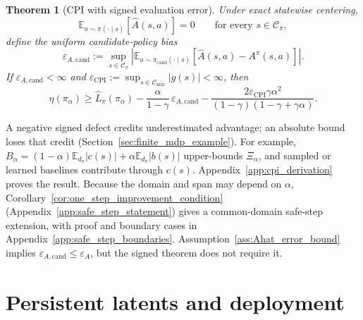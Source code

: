 \documentclass{article}
\theoremstyle{plain}
\newtheorem{theorem}{Theorem}[section]
\theoremstyle{definition}
\theoremstyle{remark}
\newcommand{\E}{\mathbb{E}}
\begin{document}
\begin{theorem}[CPI with signed evaluation error]
Under exact statewise centering,
\begin{equation}
\E_{a\sim\pi(\cdot\mid s)}[\widehat A(s,a)] = 0
\qquad\text{for every }s\in\mathcal C_\pi,
\label{eq:centering_condition}
\end{equation}
define the uniform candidate-policy bias
\begin{equation}
\varepsilon_{A,\mathrm{cand}}
:=
\sup_{s\in\mathcal C_\pi}
\left|
\E_{a\sim\pi_{\mathrm{cand}}(\cdot\mid s)}\!\left[\widehat{A}(s,a)-A^\pi(s,a)\right]
\right|.
\label{eq:epsA0_def}
\end{equation}
If $\varepsilon_{A,\mathrm{cand}}<\infty$ and
$\varepsilon_{\mathrm{CPI}}:=
\sup_{s\in\mathcal C_{\mathrm{mix}}}|g(s)|<\infty$, then
\begin{equation}
\eta(\pi_\alpha)
\ge
\widehat{L}_\pi(\pi_\alpha)
-
\frac{\alpha}{1-\gamma}\,\varepsilon_{A,\mathrm{cand}}
-
\frac{2\varepsilon_{\mathrm{CPI}}\gamma\alpha^2}
{(1-\gamma)(1-\gamma+\gamma\alpha)}.
\label{eq:main_theorem}
\end{equation}
\end{theorem}

A negative signed defect credits underestimated advantage; an absolute bound
loses that credit (Section~\ref{sec:finite_mdp_example}). For example,
$B_\alpha=(1-\alpha)\E_{d_\pi}|c(s)|+\alpha\E_{d_\pi}|b(s)|$ upper-bounds
$\Xi_\alpha$, and sampled or learned baselines contribute through $c(s)$.
Appendix~\ref{app:cpi_derivation} proves the result. Because the domain and
span may depend on $\alpha$,
Corollary~\ref{cor:one_step_improvement_condition}
(Appendix~\ref{app:safe_step_statement}) gives a common-domain safe-step
extension, with proof and boundary cases in Appendix~\ref{app:safe_step_boundaries}. Assumption~\ref{ass:Ahat_error_bound} implies
$\varepsilon_{A,\mathrm{cand}}\le\varepsilon_A$, but the signed theorem
does not require it.

\section{Persistent latents and deployment}
\label{sec:persistent_deployment_main}
\end{document}
